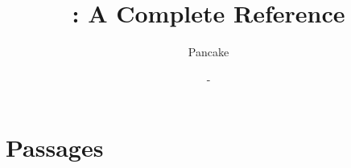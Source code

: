 \documentclass[12pt, a4paper, openright, draft]{memoir}
\begin{document}
\title{\langname : A Complete Reference}
\author{Pancake}
\date{ - \DTMtoday}
\frontmatter
\begin{titlingpage}
  \maketitle
\end{titlingpage}

\begin{KeepFromToc}
  \tableofcontents
\end{KeepFromToc}
\mainmatter




\backmatter
\chapter{Passages}
\end{document}
